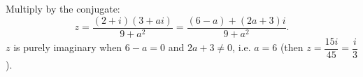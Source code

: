 Multiply by the conjugate:
\[z=\dfrac{(2+i)(3+ai)}{9+a^2}=\dfrac{(6-a)+(2a+3)i}{9+a^2}.\]
$z$ is purely imaginary when $6-a=0$ and $2a+3\ne0$, i.e. $a=\boxed{6}$ (then $z=\dfrac{15i}{45}=\dfrac i3$).
